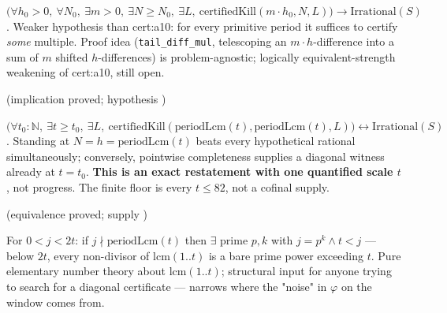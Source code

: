 \begin{thm}
$\big(\forall h_0>0,\ \forall N_0,\ \exists m>0,\ \exists N\ge N_0,\ \exists L,\ \mathrm{certifiedKill}(m\cdot h_0, N, L)\big) \to \mathrm{Irrational}(S)$. Weaker hypothesis than cert:a10: for every primitive period it suffices to certify \emph{some} multiple. Proof idea (\texttt{tail\_diff\_mul}, telescoping an $m\cdot h$-difference into a sum of $m$ shifted $h$-differences) is problem-agnostic; logically equivalent-strength weakening of cert:a10, still open.
\par\noindent{} (implication proved; hypothesis )   
\end{thm}

\begin{thm}
$\big(\forall t_0:\mathbb{N},\ \exists t\ge t_0,\ \exists L,\ \mathrm{certifiedKill}(\mathrm{periodLcm}(t), \mathrm{periodLcm}(t), L)\big) \leftrightarrow \mathrm{Irrational}(S)$. Standing at $N=h=\mathrm{periodLcm}(t)$ beats every hypothetical rational simultaneously; conversely, pointwise completeness supplies a diagonal witness already at $t=t_0$. \textbf{This is an exact restatement with one quantified scale $t$}, not progress.  The finite floor is every $t\le82$, not a cofinal supply.
\par\noindent{} (equivalence proved; supply )   
\end{thm}

\begin{lem}
For $0<j<2t$: if $j \nmid \mathrm{periodLcm}(t)$ then $\exists$ prime $p,k$ with $j=p^k \wedge t<j$ — below $2t$, every non-divisor of $\mathrm{lcm}(1..t)$ is a bare prime power exceeding $t$. Pure elementary number theory about $\mathrm{lcm}(1..t)$; structural input for anyone trying to search for a diagonal certificate — narrows where the "noise" in $\varphi$ on the window comes from.
\par\noindent{}   
\end{lem}

